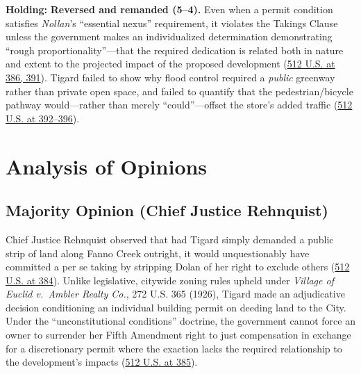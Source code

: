 \documentclass[12pt]{article}
\begin{document}
\textbf{Holding:} \textbf{Reversed and remanded (5--4).} Even when a permit condition satisfies \emph{Nollan}'s ``essential nexus'' requirement, it violates the Takings Clause unless the government makes an individualized determination demonstrating ``rough proportionality''---that the required dedication is related both in nature and extent to the projected impact of the proposed development (\href{https://supreme.justia.com/cases/federal/us/512/374/}{512 U.S. at 386, 391}). Tigard failed to show why flood control required a \emph{public} greenway rather than private open space, and failed to quantify that the pedestrian/bicycle pathway would---rather than merely ``could''---offset the store's added traffic (\href{https://supreme.justia.com/cases/federal/us/512/374/}{512 U.S. at 392--396}).

\section{Analysis of Opinions}
\subsection{Majority Opinion (Chief Justice Rehnquist)}

Chief Justice Rehnquist observed that had Tigard simply demanded a public strip of land along Fanno Creek outright, it would unquestionably have committed a per se taking by stripping Dolan of her right to exclude others (\href{https://supreme.justia.com/cases/federal/us/512/374/}{512 U.S. at 384}). Unlike legislative, citywide zoning rules upheld under \emph{Village of Euclid v.\ Ambler Realty Co.}, 272 U.S. 365 (1926), Tigard made an adjudicative decision conditioning an individual building permit on deeding land to the City. Under the ``unconstitutional conditions'' doctrine, the government cannot force an owner to surrender her Fifth Amendment right to just compensation in exchange for a discretionary permit where the exaction lacks the required relationship to the development's impacts (\href{https://supreme.justia.com/cases/federal/us/512/374/}{512 U.S. at 385}).
\end{document}
